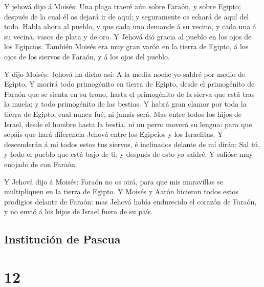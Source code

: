 Y jehová dijo á Moisés: Una plaga traeré aún sobre Faraón,
y sobre Egipto; después de la cual él os dejará ir de aquí; y
seguramente os echará de aquí del todo.  Habla ahora al
pueblo, y que cada uno demande á su vecino, y cada una á su vecina,
vasos de plata y de oro.  Y Jehová dió gracia al pueblo en
los ojos de los Egipcios. También Moisés era muy gran varón en la tierra
de Egipto, á los ojos de los siervos de Faraón, y á los ojos del pueblo.

 Y dijo Moisés: Jehová ha dicho así: A la media noche yo
saldré por medio de Egipto,  Y morirá todo primogénito en
tierra de Egipto, desde el primogénito de Faraón que se sienta en su
trono, hasta el primogénito de la sierva que está tras la muela; y todo
primogénito de las bestias.  Y habrá gran clamor por toda la
tierra de Egipto, cual nunca fué, ni jamás será.  Mas entre
todos los hijos de Israel, desde el hombre hasta la bestia, ni un perro
moverá su lengua: para que sepáis que hará diferencia Jehová entre los
Egipcios y los Israelitas.  Y descenderán á mí todos estos
tus siervos, é inclinados delante de mí dirán: Sal tú, y todo el pueblo
que está bajo de ti; y después de esto yo saldré. Y salióse muy enojado
de con Faraón.

 Y Jehová dijo á Moisés: Faraón no os oirá, para que mis
maravillas se multipliquen en la tierra de Egipto.  Y
Moisés y Aarón hicieron todos estos prodigios delante de Faraón: mas
Jehová había endurecido el corazón de Faraón, y no envió á los hijos de
Israel fuera de su país.

\hypertarget{instituciuxf3n-de-pascua}{%
\subsection{Institución de Pascua}\label{instituciuxf3n-de-pascua}}

\hypertarget{section-11}{%
\section{12}\label{section-11}}

